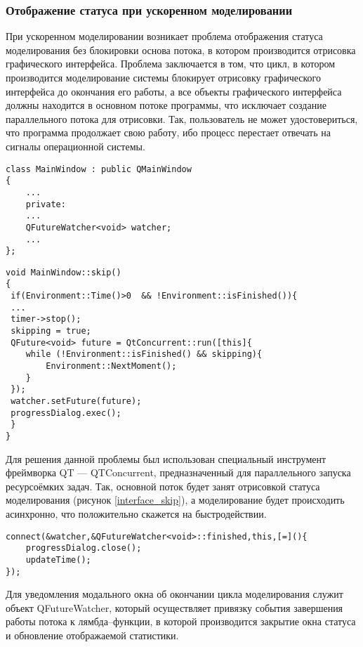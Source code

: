 \subsubsection{Отображение статуса при ускоренном моделировании}
При ускоренном моделировании возникает проблема отображения статуса моделирования без блокировки основа потока, в котором производится отрисовка графического интерфейса. Проблема заключается в том, что цикл, в котором производится моделирование системы блокирует отрисовку графического интерфейса до окончания его работы, а все объекты графического интерфейса должны находится в основном потоке программы, что исключает создание параллельного потока для отрисовки. Так, пользователь не может удостовериться, что программа продолжает свою работу, ибо процесс перестает отвечать на сигналы операционной системы.
\begin{lstlisting}
class MainWindow : public QMainWindow
{
	...
	private:
	...
	QFutureWatcher<void> watcher;
	...
};
\end{lstlisting}
\begin{lstlisting}
void MainWindow::skip()
{
 if(Environment::Time()>0  && !Environment::isFinished()){
 ...
 timer->stop();
 skipping = true;
 QFuture<void> future = QtConcurrent::run([this]{
	while (!Environment::isFinished() && skipping){
		Environment::NextMoment();
	}
 });
 watcher.setFuture(future);
 progressDialog.exec();
 }
}
\end{lstlisting}

Для решения данной проблемы был использован специальный инструмент фреймворка QT --- QTConcurrent, предназначенный для параллельного запуска ресурсоёмких задач. Так, основной поток будет занят отрисовкой статуса моделирования (рисунок \ref{interface_skip}), а моделирование будет происходить асинхронно, что положительно скажется на быстродействии.
\begin{lstlisting}
connect(&watcher,&QFutureWatcher<void>::finished,this,[=](){
	progressDialog.close();
	updateTime();
});
\end{lstlisting}
Для уведомления модального окна об окончании цикла моделирования служит объект QFutureWatcher, который осуществляет привязку события завершения работы потока к лямбда--функции, в которой производится закрытие окна статуса и обновление отображаемой статистики.
\clearpage